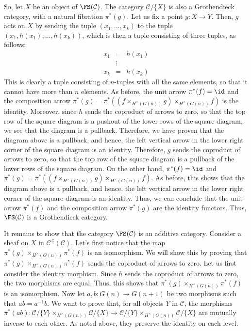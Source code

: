 \documentclass[a4paper,reqno,oneside]{article}
\begin{document}
So, let $X$ be an object of $\FS(\mathcal{C})$. The category $\mathcal{C}/\{X\}$ is also a Grothendieck category, with a natural fibration $\pi^{*}(g)$. Let us fix a point $y: X \rightarrow Y$. Then, $g$ acts on $X$ by sending the tuple $(x_1,\dots,x_k)$ to the tuple $(x_1,h(x_1), \dots, h(x_k))$, which is then a tuple consisting of three tuples, as follows:
\[
\begin{array}{ccccl}
x_1&=&h(x_1)\\
&\vdots&\\
x_k&=&h(x_k)
\end{array}
\]
This is clearly a tuple consisting of $n$-tuples with all the same elements, so that it cannot have more than $n$ elements. As before, the unit arrow $\pi^{*}(f) = \id$ and the composition arrow $\pi^{*}(g) = \pi^{*}((f \times_{H^{\times}(G(n))} g) \times_{H^{\times}(G(n))} f)$ is the identity. Moreover, since $h$ sends the coproduct of arrows to zero, so that the top row of the square diagram is a pushout of the lower rows of the square diagram, we see that the diagram is a pullback. Therefore, we have proven that the diagram above is a pullback, and hence, the left vertical arrow in the lower right corner of the square diagram is an identity. Therefore, $g$ sends the coproduct of arrows to zero, so that the top row of the square diagram is a pullback of the lower rows of the square diagram. On the other hand, $\pi^{*}(f) = \id$ and $\pi^{*}(g) = \pi^{*}((f \times_{H^{\times}(G(n))} g) \times_{H^{\times}(G(n))} f)$. As before, this shows that the diagram above is a pullback, and hence, the left vertical arrow in the lower right corner of the square diagram is an identity. Thus, we can conclude that the unit arrow $\pi^{*}(f)$ and the composition arrow $\pi^{*}(g)$ are the identity functors. Thus, $\FS(\mathcal{C})$ is a Grothendieck category. 

It remains to show that the category $\FS(\mathcal{C})$ is an additive category. Consider a sheaf on $X$ in $\mathcal{C}^{\mathcal{Z}}(\mathcal{C})$. Let's first notice that the map $\pi^{*}(g) \times_{H^{\times}(G(n))} \pi^{*}(f)$ is an isomorphism. We will show this by proving that $\pi^{*}(g) \times_{H^{\times}(G(n))} \pi^{*}(f)$ sends the coproduct of arrows to zero. Let us first consider the identity morphism. Since $h$ sends the coproduct of arrows to zero, the two morphisms are equal. Thus, this shows that $\pi^{*}(g) \times_{H^{\times}(G(n))} \pi^{*}(f)$ is an isomorphism. Now let $a,b: G(n) \rightarrow G(n + 1)$ be two morphisms such that $ab = a^{-1}b$. We want to prove that, for all objects $Y$ in $\mathcal{C}$, the morphisms $\pi^{*}(ab): \mathcal{C}/\{Y\} \times_{H^{\times}(G(n))} \mathcal{C}/\{X\} \rightarrow \mathcal{C}/\{Y\} \times_{H^{\times}(G(n))} \mathcal{C}/\{X\}$ are mutually inverse to each other. As noted above, they preserve the identity on each level.
\end{document}
